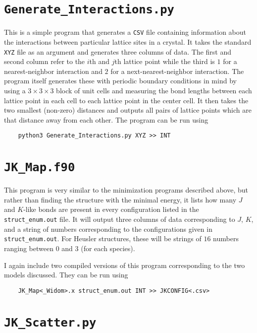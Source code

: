\documentclass[12pt]{article}
\begin{document}
\section{\texttt{Generate\_Interactions.py}}

This is a simple program that generates a \texttt{CSV} file containing information about the interactions between particular lattice sites in a crystal. It takes the standard \texttt{XYZ} file as an argument and generates three columns of data. The first and second column refer to the $ i $th and $ j $th lattice point while the third is $ 1 $ for a nearest-neighbor interaction and $ 2 $ for a next-nearest-neighbor interaction. The program itself generates these with periodic boundary conditions in mind by using a $ 3 \times 3 \times 3 $ block of unit cells and measuring the bond lengths between each lattice point in each cell to each lattice point in the center cell. It then takes the two smallest (non-zero) distances and outputs all pairs of lattice points which are that distance away from each other. The program can be run using
\begin{verbatim}
    python3 Generate_Interactions.py XYZ >> INT
\end{verbatim}

\section{\texttt{JK\_Map.f90}}

This program is very similar to the minimization programs described above, but rather than finding the structure with the minimal energy, it lists how many $ J $ and $ K $-like bonds are present in every configuration listed in the \texttt{struct\_enum.out} file. It will output three columns of data corresponding to $ J $, $ K $, and a string of numbers corresponding to the configurations given in \texttt{struct\_enum.out}. For Heusler structures, these will be strings of $ 16 $ numbers ranging between $ 0 $ and $ 3 $ (for each species).

I again include two compiled versions of this program corresponding to the two models discussed. They can be run using
\begin{verbatim}
    JK_Map<_Widom>.x struct_enum.out INT >> JKCONFIG<.csv>
\end{verbatim}

\section{\texttt{JK\_Scatter.py}}
\end{document}
